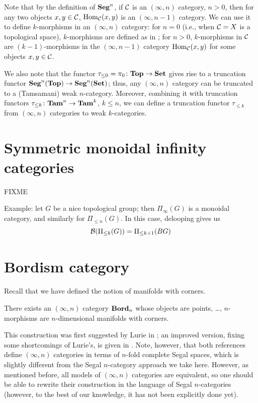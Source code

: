 Note that by the definition of $\mathbf{Seg}^n$, if $\mathcal{C}$ is an $(\infty, n)$
category, $n>0$, then for any two objects $x,y\in \mathcal{C}$, $\operatorname{Hom}_{\mathcal{C}}(x,y)$ is
an $(\infty, n-1)$ category. We can use it to define $k$-morphisms in an
$(\infty, n)$ category: for $n=0$ (i.e., when $\mathcal{C}=X$ is a topological space),
$k$-morphisms are defined as in ; for $n>0$,
$k$-morphisms in $\mathcal{C}$ are $(k-1)$-morphisms in the $(\infty, n-1)$ category
$\operatorname{Hom}_{\mathcal{C}}(x,y)$ for some objects $x,y\in \mathcal{C}$.

We also note that the functor $\tau_{\leq 0}=\pi_0\colon \mathbf{Top}\to\mathbf{Set}$ gives rise to
a truncation functor $\mathbf{Seg}^n(\mathbf{Top})\to \mathbf{Seg}^n(\mathbf{Set})$; thus, any $(\infty, n)$
category can be truncated to a (Tamsamani) weak $n$-category. Moreover,
combining it with truncation functors $\tau_{\leq k}\colon \mathbf{Tam}^n\to \mathbf{Tam}^k$, $k
\le n$, we can define a truncation functor $\tau_{\leq k}$ from $(\infty, n)$
categories to weak $k$-categories.


\section{Symmetric monoidal infinity categories}\label{s:monoidal-infty}

FIXME

Example: let $G$ be a nice topological group; then $\Pi_\infty(G)$ is a
monoidal category, and similarly for $\Pi_{\le n}(G)$. In this case, delooping
gives us
$$
\mathcal{B}(\Pi_{\le k}(G))=\Pi_{\le k+1}(BG)
$$





\section{Bordism category}\label{s:bordn-highercat}
Recall that we have defined the notion of manifolds with corners.

\begin{theorem}\label{t:bordn-highercat}
  There exists an $(\infty, n)$ category $\mathbf{Bord}_n$ whose objects are points,
  \dots, $n$-morphisms are $n$-dimensional manifolds with corners.
\end{theorem}
This construction was first suggested by Lurie in ; an
improved version, fixing some shortcomings of Lurie's, is given in
. Note, however, that both references define $(\infty, n)$
categories in terms of $n$-fold complete Segal spaces, which is slightly
different from the Segal $n$-category approach we take here. However, as
mentioned before, all models of $(\infty, n)$ categories are equivalent, so one
should be able to rewrite their construction in the language of Segal
$n$-categories (however, to the best of our knowledge, it has not been
explicitly done yet).


\clearpage